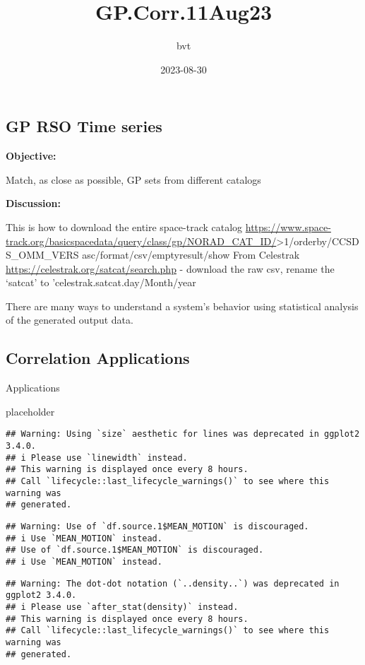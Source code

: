 \documentclass[
]{article}
\title{GP.Corr.11Aug23}
\author{bvt}
\date{2023-08-30}
\begin{document}
\maketitle

\hypertarget{gp-rso-time-series}{%
\subsection{GP RSO Time series}\label{gp-rso-time-series}}

\textbf{Objective:}

Match, as close as possible, GP sets from different catalogs

\textbf{Discussion:}

This is how to download the entire space-track catalog
\url{https://www.space-track.org/basicspacedata/query/class/gp/NORAD_CAT_ID/}\textgreater1/orderby/CCSDS\_OMM\_VERS
asc/format/csv/emptyresult/show From Celestrak
\url{https://celestrak.org/satcat/search.php} - download the raw csv,
rename the `satcat' to 'celestrak.satcat.day/Month/year

There are many ways to understand a system's behavior using statistical
analysis of the generated output data.

\hypertarget{correlation-applications}{%
\subsection{Correlation Applications}\label{correlation-applications}}

Applications

placeholder

\begin{verbatim}
## Warning: Using `size` aesthetic for lines was deprecated in ggplot2 3.4.0.
## i Please use `linewidth` instead.
## This warning is displayed once every 8 hours.
## Call `lifecycle::last_lifecycle_warnings()` to see where this warning was
## generated.
\end{verbatim}

\begin{verbatim}
## Warning: Use of `df.source.1$MEAN_MOTION` is discouraged.
## i Use `MEAN_MOTION` instead.
## Use of `df.source.1$MEAN_MOTION` is discouraged.
## i Use `MEAN_MOTION` instead.
\end{verbatim}

\begin{verbatim}
## Warning: The dot-dot notation (`..density..`) was deprecated in ggplot2 3.4.0.
## i Please use `after_stat(density)` instead.
## This warning is displayed once every 8 hours.
## Call `lifecycle::last_lifecycle_warnings()` to see where this warning was
## generated.
\end{verbatim}
\end{document}
